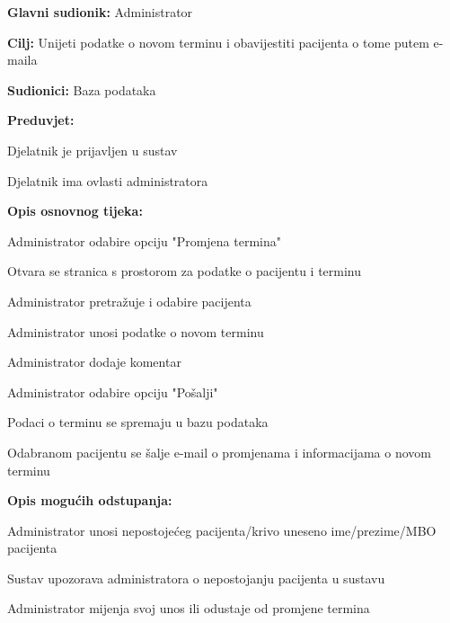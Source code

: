 				\noindent {}
				\begin{packed_item}
					
					\item \textbf{Glavni sudionik: }Administrator
					\item  \textbf{Cilj: }Unijeti podatke o novom terminu i obavijestiti pacijenta o tome putem e-maila 
					\item  \textbf{Sudionici: }Baza podataka
					\item  \textbf{Preduvjet: }
					\item[] \begin{packed_enum}
						
						\item[-] Djelatnik je prijavljen u sustav
						\item[-] Djelatnik ima ovlasti administratora
					\end{packed_enum}
					\item  \textbf{Opis osnovnog tijeka: }
					
					\item[] \begin{packed_enum}
						\item Administrator odabire opciju "Promjena termina"
						\item Otvara se stranica s prostorom za podatke o pacijentu i terminu
						\item Administrator pretražuje i odabire pacijenta
						\item Administrator unosi podatke o novom terminu
						\item Administrator dodaje komentar
						\item Administrator odabire opciju "Pošalji"
						\item Podaci o terminu se spremaju u bazu podataka
						\item Odabranom pacijentu se šalje e-mail o promjenama i informacijama o novom terminu
					\end{packed_enum}
					
					\item  \textbf{Opis mogućih odstupanja:}
					
					\item[] \begin{packed_item}
						
						\item[3.a] Administrator unosi nepostojećeg pacijenta/krivo uneseno ime/prezime/MBO pacijenta
						\item[] \begin{packed_enum}
							\item Sustav upozorava administratora o nepostojanju pacijenta u sustavu
							\item Administrator mijenja svoj unos ili odustaje od promjene termina
						\end{packed_enum}
					\end{packed_item}
				\end{packed_item}
				

